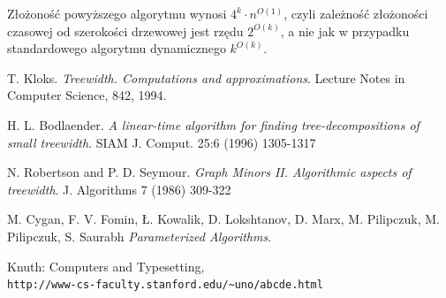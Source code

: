 \documentclass[12pt, oneside]{report}
\newcommand\Omicron{O}
\begin{document}
Złożoność powyższego algorytmu wynosi $4^k \cdot n^{\Omicron(1)}$, czyli zależność złożoności czasowej od szerokości drzewowej jest rzędu $2^{\Omicron(k)}$, a nie jak w przypadku standardowego algorytmu dynamicznego $k^{\Omicron(k)}$.

\newpage
	\begin{thebibliography}{9}
			T. Kloks. 
			\textit{Treewidth. Computations and approximations}. 
			Lecture Notes in Computer Science, 842, 1994.
 
			H. L. Bodlaender. 
			\textit{A linear-time algorithm for finding tree-decompositions of small treewidth}. 
			SIAM J. Comput. 25:6 (1996) 1305-1317
			
			N. Robertson and P. D. Seymour. 
			\textit{Graph Minors II. Algorithmic aspects of treewidth}. 
			J. Algorithms 7 (1986) 309-322
			
			M. Cygan, F. V. Fomin, Ł. Kowalik, D. Lokshtanov, D. Marx, M. Pilipczuk, M. Pilipczuk, S. Saurabh
 			\textit{Parameterized Algorithms}.
 			
			Knuth: Computers and Typesetting,
			\\\texttt{http://www-cs-faculty.stanford.edu/\~{}uno/abcde.html}
	\end{thebibliography} 
\end{document}
